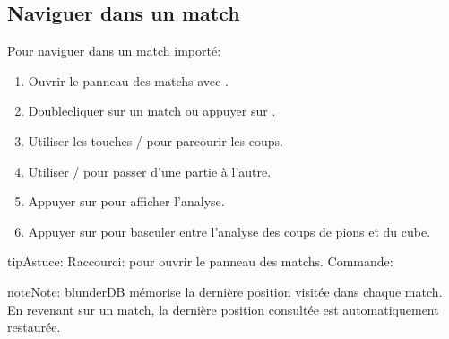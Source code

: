 \documentclass[letterpaper,10pt,french]{sphinxmanual}
\begin{document}
\subsection{Naviguer dans un match}
\label{\detokenize{guide_utilisateur:naviguer-dans-un-match}}
\sphinxAtStartPar
Pour naviguer dans un match importé:
\begin{enumerate}
%
\item {} 
\sphinxAtStartPar
Ouvrir le panneau des matchs avec .

\item {} 
\sphinxAtStartPar
Double\sphinxhyphen{}cliquer sur un match ou appuyer sur .

\item {} 
\sphinxAtStartPar
Utiliser les touches  /  pour parcourir les coups.

\item {} 
\sphinxAtStartPar
Utiliser  /  pour passer d’une partie à l’autre.

\item {} 
\sphinxAtStartPar
Appuyer sur  pour afficher l’analyse.

\item {} 
\sphinxAtStartPar
Appuyer sur  pour basculer entre l’analyse des coups de pions et du cube.

\end{enumerate}

\begin{sphinxadmonition}{tip}{Astuce:}
\sphinxAtStartPar
Raccourci:  pour ouvrir le panneau des matchs.
Commande: 
\end{sphinxadmonition}

\begin{sphinxadmonition}{note}{Note:}
\sphinxAtStartPar
blunderDB mémorise la dernière position visitée dans chaque match. En
revenant sur un match, la dernière position consultée est automatiquement
restaurée.
\end{sphinxadmonition}
\end{document}
